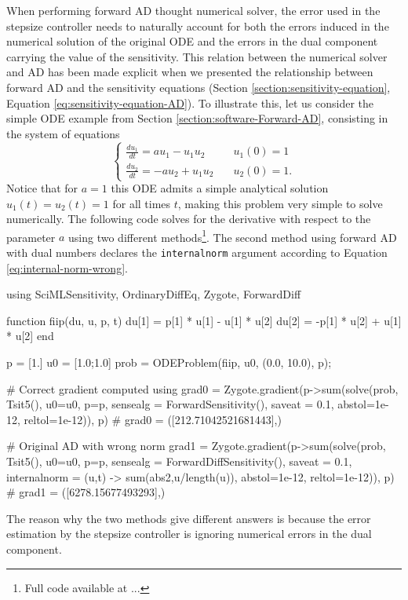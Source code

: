 When performing forward AD thought numerical solver, the error used in the stepsize controller needs to naturally account for both the errors induced in the numerical solution of the original ODE and the errors in the dual component carrying the value of the sensitivity. 
This relation between the numerical solver and AD has been made explicit when we presented the relationship between forward AD and the sensitivity equations (Section \ref{section:sensitivity-equation}, Equation \eqref{eq:sensitivity-equation-AD}). 
To illustrate this, let us consider the simple ODE example from Section \ref{section:software-Forward-AD}, consisting in the system of equations 
\begin{equation}
\begin{cases}
 \frac{du_1}{dt} = a u_1 - u_1 u_2 & \quad u_1(0) = 1  \\ 
 \frac{du_2}{dt} = - a u_2 + u_1 u_2 & \quad u_2(0) = 1.
\end{cases}
\end{equation}
Notice that for $a = 1$ this ODE admits a simple analytical solution $u_1(t) = u_2(t) = 1$ for all times $t$, making this problem very simple to solve numerically.
The following code solves for the derivative with respect to the parameter $a$ using two different methods\footnote{Full code available at ...}. 
The second method using forward AD with dual numbers declares the \texttt{internalnorm} argument according to Equation \eqref{eq:internal-norm-wrong}.
\begin{jllisting}
using SciMLSensitivity, OrdinaryDiffEq, Zygote, ForwardDiff

function fiip(du, u, p, t)
    du[1] =  p[1] * u[1] - u[1] * u[2]
    du[2] = -p[1] * u[2] + u[1] * u[2]
end

p = [1.]
u0 = [1.0;1.0]
prob = ODEProblem(fiip, u0, (0.0, 10.0), p);

# Correct gradient computed using 
grad0 = Zygote.gradient(p->sum(solve(prob, Tsit5(), u0=u0, p=p, sensealg = ForwardSensitivity(), saveat = 0.1, abstol=1e-12, reltol=1e-12)), p)
# grad0 = ([212.71042521681443],)

# Original AD with wrong norm 
grad1 = Zygote.gradient(p->sum(solve(prob, Tsit5(), u0=u0, p=p, sensealg = ForwardDiffSensitivity(), saveat = 0.1, internalnorm = (u,t) -> sum(abs2,u/length(u)), abstol=1e-12, reltol=1e-12)), p)
# grad1 = ([6278.15677493293],)
\end{jllisting}
The reason why the two methods give different answers is because the error estimation by the stepsize controller is ignoring numerical errors in the dual component. 
